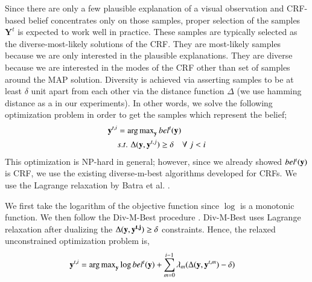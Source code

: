 Since there are only a few plausible explanation of a visual observation and CRF-based belief concentrates only on those samples, proper selection of the samples $\mathbf{Y}^t$ is expected to work well in practice. These samples are typically selected as the diverse-most-likely solutions of the CRF. They are most-likely samples because we are only interested in the plausible explanations. They are diverse because we are interested in the modes of the CRF other than set of samples around the MAP solution. Diversity is achieved via asserting samples to be at least $\delta$ unit apart from each other via the distance function $\Delta$ (we use hamming distance as a in our experiments). In other words, we solve the following optimization problem in order to get the samples which represent the belief;
\begin{equation}
\begin{aligned}
\mathbf{y}^{t,i} &= \argmax_{\mathbf{y}}  bel^t(\mathbf{y}) \\
&s.t.\,\, \Delta(\mathbf{y},\mathbf{y}^{t,j}) \geq \delta \quad \forall \; {j < i}
\end{aligned}
\label{divopt}
\end{equation}
This optimization is NP-hard in general; however, since we already showed $bel^t(\bf{y})$ is CRF, we use the existing diverse-m-best algorithms developed for CRFs. We use the Lagrange relaxation by Batra et al. \cite{divmbest}. 

We first take the logarithm of the objective function since $\log$ is a monotonic function. We then follow the Div-M-Best procedure \cite{divmbest}. Div-M-Best uses Lagrange relaxation after dualizing the $\Delta(\bf{y},\bf{y}^{t,j}) \geq \delta$ constraints. Hence, the relaxed unconstrained optimization problem is,
\begin{equation}
\begin{aligned}
\mathbf{y}^{t,i} &= \argmax_{\mathbf{y}}  \log bel^t(\mathbf{y}) + \sum_{m=0}^{i-1} \lambda_m (\Delta(\mathbf{y},\mathbf{y}^{t,m}) - \delta)
\end{aligned}
\label{divoptL}
\end{equation}


